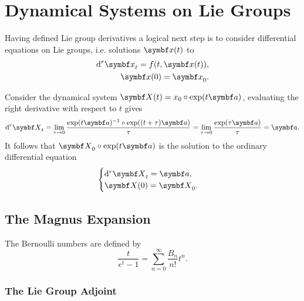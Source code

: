 
\chapter{Dynamical Systems on Lie Groups}

Having defined Lie group derivatives a logical next step is to consider differential equations on Lie groups, i.e. solutions $\x(t)$ to
\begin{equation}
  \begin{aligned}
    \mathrm{d}^r \x_t = f(t, \x(t)), \\
    \x(0) = \x_0.
  \end{aligned}
\end{equation}

Consider the dynamical system $\X(t) = x_0 \circ \exp(t \a)$, evaluating the right derivative with respect to $t$ gives
\begin{equation}
  \mathrm{d}^r \X_t = \lim_{\tau \rightarrow 0} \frac{\exp(t \a)^{-1} \circ \exp((t + \tau) \a)}{\tau} = \lim_{\tau \rightarrow 0} \frac{\exp(\tau \a)}{\tau} = \a.
\end{equation}
It follows that $\X_0 \circ \exp (t \a)$ is the solution to the ordinary differential equation
\begin{equation}
  \begin{cases}
    \mathrm{d}^r \X_t = \a, \\
    \X(0) = \X_0.
  \end{cases}
\end{equation}


\section{The Magnus Expansion}

The Bernoulli numbers are defined by
\begin{equation}
  \label{eq:bernoulli_number_definition}
  \frac{t}{e^t - 1} = \sum_{n=0}^\infty \frac{B_n}{n!} t^n.
\end{equation}

\subsection{The Lie Group Adjoint}

